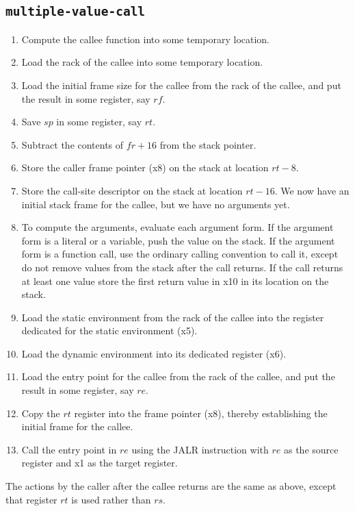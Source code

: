 \subsection{\texttt{multiple-value-call}}

\begin{enumerate}
\item Compute the callee function into some temporary location.
\item Load the rack of the callee into some temporary location.
\item Load the initial frame size for the callee from the rack of the
  callee, and put the result in some register, say $rf$.
\item Save $sp$ in some register, say $rt$. 
\item Subtract the contents of $fr + 16$ from the stack pointer.
\item Store the caller frame pointer (x8) on the stack at location $rt
  - 8$.
\item Store the call-site descriptor on the stack at location $rt -
  16$.  We now have an initial stack frame for the callee, but we have
  no arguments yet.
\item To compute the arguments, evaluate each argument form.  If the
  argument form is a literal or a variable, push the value on the
  stack.  If the argument form is a function call, use the ordinary
  calling convention to call it, except do not remove values from the
  stack after the call returns.  If the call returns at least one
  value store the first return value in x10 in its location on the
  stack.
\item Load the static environment from the rack of the callee into the
  register dedicated for the static environment (x5).
\item Load the dynamic environment into its dedicated register (x6).
\item Load the entry point for the callee from the rack of the callee,
  and put the result in some register, say $re$.
\item Copy the $rt$ register into the frame pointer (x8), thereby
  establishing the initial frame for the callee.
\item Call the entry point in $re$ using the JALR instruction with
  $re$ as the source register and x1 as the target register.
\end{enumerate}

The actions by the caller after the callee returns are the same as
above, except that register $rt$ is used rather than $rs$.

